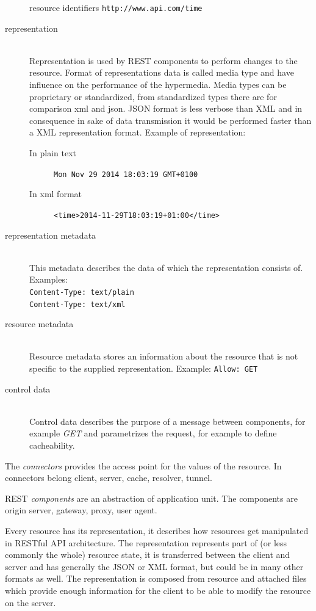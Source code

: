 \begin{description}
 
  resource identifiers 
  \texttt{http://www.api.com/time}
  \item [representation] \hfill \\
  Representation is used by REST components to perform changes to the resource. Format of representations data is called media type and have influence on the performance of the hypermedia. Media types can be proprietary or standardized, from standardized types there are for comparison \gls{xml} and \gls{json}. JSON format is less verbose than XML and in consequence in sake of data transmission it would be performed faster than a XML representation format.
  Example of representation:
  \begin{description}
    \item[In plain text] \texttt{Mon Nov 29 2014 18:03:19 GMT+0100}
    \item[In xml format] \texttt{<time>2014-11-29T18:03:19+01:00</time>}
  \end{description}
  \item [representation metadata] \hfill \\
  This metadata describes the data of which the representation consists of.
  Examples: \hfill \\
  \texttt{Content-Type: text/plain} \hfill \\
  \texttt{Content-Type: text/xml}
   \item [resource metadata] \hfill \\
  Resource metadata stores an information about the resource that is not specific to the supplied representation.
  Example: \texttt{Allow: GET}
  \item [control data] \hfill \\
  Control data describes the purpose of a message between components, for example \emph{GET} and parametrizes the request, for example to define cacheability. 
\end{description}

The \emph{connectors} provides the access point for the values of the resource. In connectors belong client, server, cache, resolver, tunnel. %

REST \emph{components} are an abstraction of application unit. The components are origin server, gateway, proxy, user agent. %

\bigskip

Every resource has its representation, it describes how resources get manipulated in RESTful API architecture. The representation represents part of (or less commonly the whole) resource state, it is transferred between the client and server and has generally the JSON or XML format, but could be in many other formats as well. The representation is composed from resource and attached files which provide enough information for the client to be able to modify the resource on the server.

